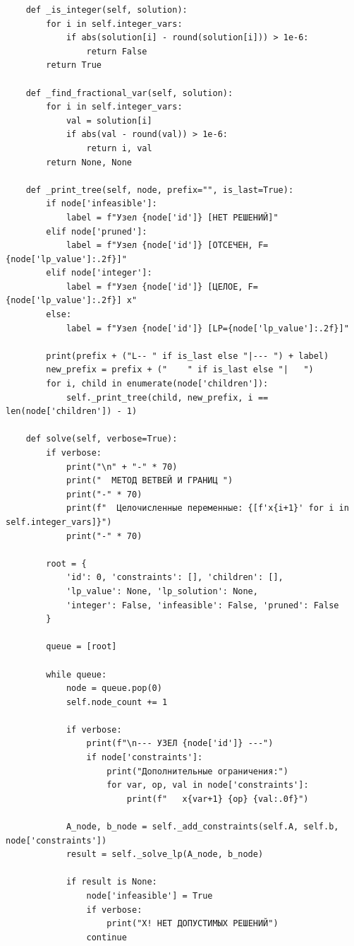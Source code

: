 \documentclass[oneside,a4paper,14pt]{extarticle}
\begin{document}
\begin{verbatim}
    def _is_integer(self, solution):
        for i in self.integer_vars:
            if abs(solution[i] - round(solution[i])) > 1e-6:
                return False
        return True

    def _find_fractional_var(self, solution):
        for i in self.integer_vars:
            val = solution[i]
            if abs(val - round(val)) > 1e-6:
                return i, val
        return None, None

    def _print_tree(self, node, prefix="", is_last=True):
        if node['infeasible']:
            label = f"Узел {node['id']} [НЕТ РЕШЕНИЙ]"
        elif node['pruned']:
            label = f"Узел {node['id']} [ОТСЕЧЕН, F={node['lp_value']:.2f}]"
        elif node['integer']:
            label = f"Узел {node['id']} [ЦЕЛОЕ, F={node['lp_value']:.2f}] x"
        else:
            label = f"Узел {node['id']} [LP={node['lp_value']:.2f}]"

        print(prefix + ("L-- " if is_last else "|--- ") + label)
        new_prefix = prefix + ("    " if is_last else "|   ")
        for i, child in enumerate(node['children']):
            self._print_tree(child, new_prefix, i == len(node['children']) - 1)

    def solve(self, verbose=True):
        if verbose:
            print("\n" + "-" * 70)
            print("  МЕТОД ВЕТВЕЙ И ГРАНИЦ ")
            print("-" * 70)
            print(f"  Целочисленные переменные: {[f'x{i+1}' for i in self.integer_vars]}")
            print("-" * 70)

        root = {
            'id': 0, 'constraints': [], 'children': [],
            'lp_value': None, 'lp_solution': None,
            'integer': False, 'infeasible': False, 'pruned': False
        }

        queue = [root]

        while queue:
            node = queue.pop(0)
            self.node_count += 1

            if verbose:
                print(f"\n--- УЗЕЛ {node['id']} ---")
                if node['constraints']:
                    print("Дополнительные ограничения:")
                    for var, op, val in node['constraints']:
                        print(f"   x{var+1} {op} {val:.0f}")

            A_node, b_node = self._add_constraints(self.A, self.b, node['constraints'])
            result = self._solve_lp(A_node, b_node)

            if result is None:
                node['infeasible'] = True
                if verbose:
                    print("X! НЕТ ДОПУСТИМЫХ РЕШЕНИЙ")
                continue


\end{verbatim}
\end{document}
